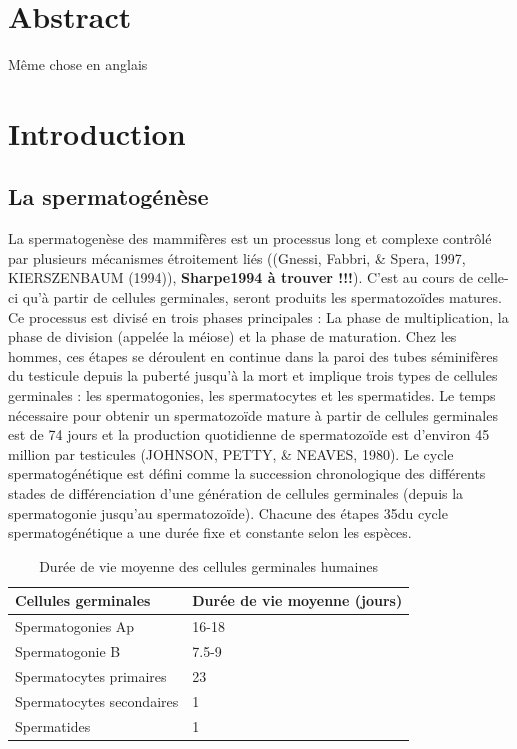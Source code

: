 \documentclass[12pt,twoside]{reedthesis}
\theoremstyle{definition}
\theoremstyle{definition}
\theoremstyle{remark}
\begin{document}
  \chapter*{Abstract}\label{abstract}
  
  Même chose en anglais
  
  \chapter{Introduction}\label{introInf}
  
  \section{La spermatogénèse}\label{la-spermatogenese}
  
  La spermatogenèse des mammifères est un processus long et complexe
  contrôlé par plusieurs mécanismes étroitement liés ((Gnessi, Fabbri, \&
  Spera, 1997, KIERSZENBAUM (1994)), \textbf{Sharpe1994 à trouver !!!}).
  C'est au cours de celle-ci qu'à partir de cellules germinales, seront
  produits les spermatozoïdes matures. Ce processus est divisé en trois
  phases principales : La phase de multiplication, la phase de division
  (appelée la méiose) et la phase de maturation. Chez les hommes, ces
  étapes se déroulent en continue dans la paroi des tubes séminifères du
  testicule depuis la puberté jusqu'à la mort et implique trois types de
  cellules germinales : les spermatogonies, les spermatocytes et les
  spermatides. Le temps nécessaire pour obtenir un spermatozoïde mature à
  partir de cellules germinales est de 74 jours et la production
  quotidienne de spermatozoïde est d'environ 45 million par testicules
  (JOHNSON, PETTY, \& NEAVES, 1980). Le cycle spermatogénétique est défini
  comme la succession chronologique des différents stades de
  différenciation d'une génération de cellules germinales (depuis la
  spermatogonie jusqu'au spermatozoïde). Chacune des étapes 35du cycle
  spermatogénétique a une durée fixe et constante selon les espèces.
  
  \begin{table}
  
  \caption{\label{tab:unnamed-chunk-1}Durée de vie moyenne des cellules germinales humaines}
  \centering
  \begin{tabular}[t]{l|l}
  \hline
  Cellules germinales & Durée de vie moyenne (jours)\\
  \hline
  Spermatogonies Ap & 16-18\\
  \hline
  Spermatogonie B & 7.5-9\\
  \hline
  Spermatocytes primaires & 23\\
  \hline
  Spermatocytes secondaires & 1\\
  \hline
  Spermatides & 1\\
  \hline
  \end{tabular}
  \end{table}
  
\end{document}
